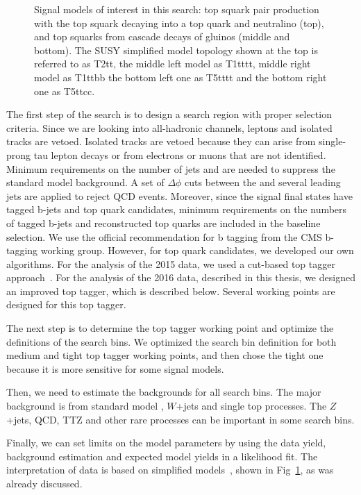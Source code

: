 \begin{figure}[ht!]
\begin{centering}
\caption{Signal models of interest in this search:
top squark pair production with the top squark decaying into a top quark and
neutralino (top),
and top squarks from cascade decays of gluinos (middle and bottom).
The SUSY simplified model topology shown at the top is referred to as T2tt,
the middle left model as T1tttt, middle right model as T1ttbb
the bottom left one as T5tttt and the bottom right one as T5ttcc.}
\label{fig:signal_diagrams}
\end{centering}
\end{figure}

The first step of the search is to design a search region with proper selection criteria. Since we are looking into all-hadronic channels, leptons and isolated tracks are vetoed. Isolated tracks are vetoed because they can arise from single-prong tau lepton decays or from electrons or muons that are not identified. Minimum requirements on the number of jets and \MET are needed to suppress the standard model background. A set of $\Delta\phi$ cuts between the \MET and several leading jets are applied to reject QCD events. Moreover, since the signal final states have tagged b-jets and top quark candidates, minimum requirements on the numbers of tagged b-jets and reconstructed top quarks are included in the baseline selection. We use the official recommendation for b tagging from the CMS b-tagging working group. However, for top quark candidates, we developed our own algorithms. For the analysis of the 2015 data, we used a cut-based top tagger approach~\cite{PhysRevD.96.012004}. For the analysis of the 2016 data, described in this thesis, we designed an improved top tagger, which is described below. Several working points are designed for this top tagger.

The next step is to determine the top tagger working point and optimize the definitions of the search bins. We optimized the search bin definition for both medium and tight top tagger working points, and then chose the tight one because it is more sensitive for some signal models.

Then, we need to estimate the backgrounds for all search bins. The major background is from standard model \ttbar, $W$+jets and single top processes. The $Z$+jets, QCD, TTZ and other rare processes can be important in some search bins.

Finally, we can set limits on the model parameters by using the data yield, background estimation and expected model yields in a likelihood fit. The interpretation of data is based on simplified models~\cite{Alwall:2008ag}, shown in Fig~\ref{fig:signal_diagrams}, as was already discussed.
